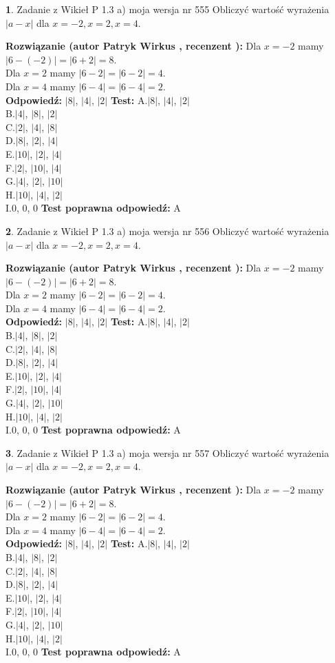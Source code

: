 \documentclass[12pt, a4paper]{article}
\theoremstyle{definition} %
\newtheorem{zad}{}
\newcommand{\zadStart}[1]{\begin{zad}#1\newline}
\newcommand{\zadStop}{\end{zad}}
\newcommand{\rozwStart}[2]{\noindent \textbf{Rozwiązanie (autor #1 , recenzent #2): }\newline}
\newcommand{\rozwStop}{\newline}
\newcommand{\odpStart}{\noindent \textbf{Odpowiedź:}\newline}
\newcommand{\odpStop}{\newline}
\newcommand{\testStart}{\noindent \textbf{Test:}\newline}
\newcommand{\testStop}{\newline}
\newcommand{\kluczStart}{\noindent \textbf{Test poprawna odpowiedź:}\newline}
\newcommand{\kluczStop}{\newline}
\begin{document}
\zadStart{Zadanie z Wikieł P 1.3 a) moja wersja nr 555}
Obliczyć wartość wyrażenia $|a - x|$ dla $x=-2,x=2,x=4$.
\zadStop
\rozwStart{Patryk Wirkus}{}
Dla $x = -2$ mamy $|6 - (-2)| = |6 + 2| = 8$.\\
Dla $x = 2$ mamy $|6 - 2| = |6 - 2| = 4$.\\
Dla $x = 4$ mamy $|6 - 4| = |6 - 4| = 2$.\\
\rozwStop
\odpStart
$|8|$, $|4|$, $|2|$
\odpStop
\testStart
A.$|8|$, $|4|$, $|2|$\\
B.$|4|$, $|8|$, $|2|$\\
C.$|2|$, $|4|$, $|8|$\\
D.$|8|$, $|2|$, $|4|$\\
E.$|10|$, $|2|$, $|4|$\\
F.$|2|$, $|10|$, $|4|$\\
G.$|4|$, $|2|$, $|10|$\\
H.$|10|$, $|4|$, $|2|$\\
I.$0$, $0$, $0$
\testStop
\kluczStart
A
\kluczStop



\zadStart{Zadanie z Wikieł P 1.3 a) moja wersja nr 556}
Obliczyć wartość wyrażenia $|a - x|$ dla $x=-2,x=2,x=4$.
\zadStop
\rozwStart{Patryk Wirkus}{}
Dla $x = -2$ mamy $|6 - (-2)| = |6 + 2| = 8$.\\
Dla $x = 2$ mamy $|6 - 2| = |6 - 2| = 4$.\\
Dla $x = 4$ mamy $|6 - 4| = |6 - 4| = 2$.\\
\rozwStop
\odpStart
$|8|$, $|4|$, $|2|$
\odpStop
\testStart
A.$|8|$, $|4|$, $|2|$\\
B.$|4|$, $|8|$, $|2|$\\
C.$|2|$, $|4|$, $|8|$\\
D.$|8|$, $|2|$, $|4|$\\
E.$|10|$, $|2|$, $|4|$\\
F.$|2|$, $|10|$, $|4|$\\
G.$|4|$, $|2|$, $|10|$\\
H.$|10|$, $|4|$, $|2|$\\
I.$0$, $0$, $0$
\testStop
\kluczStart
A
\kluczStop



\zadStart{Zadanie z Wikieł P 1.3 a) moja wersja nr 557}
Obliczyć wartość wyrażenia $|a - x|$ dla $x=-2,x=2,x=4$.
\zadStop
\rozwStart{Patryk Wirkus}{}
Dla $x = -2$ mamy $|6 - (-2)| = |6 + 2| = 8$.\\
Dla $x = 2$ mamy $|6 - 2| = |6 - 2| = 4$.\\
Dla $x = 4$ mamy $|6 - 4| = |6 - 4| = 2$.\\
\rozwStop
\odpStart
$|8|$, $|4|$, $|2|$
\odpStop
\testStart
A.$|8|$, $|4|$, $|2|$\\
B.$|4|$, $|8|$, $|2|$\\
C.$|2|$, $|4|$, $|8|$\\
D.$|8|$, $|2|$, $|4|$\\
E.$|10|$, $|2|$, $|4|$\\
F.$|2|$, $|10|$, $|4|$\\
G.$|4|$, $|2|$, $|10|$\\
H.$|10|$, $|4|$, $|2|$\\
I.$0$, $0$, $0$
\testStop
\kluczStart
A
\kluczStop
\end{document}
